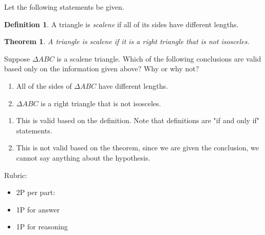 \documentclass{article}
\newtheorem*{theorem}{Theorem}
\theoremstyle{definition}
\newtheorem*{definition}{Definition}
\begin{document}
\begin{question}{4}
    Let the following statements be given. 
       \begin{definition}
          A triangle is \emph{scalene} if all of its sides have different lengths.
       \end{definition}
       \begin{theorem}
          A triangle is scalene if it is a right triangle that is not isosceles.
       \end{theorem}
    Suppose $\Delta ABC$ is a scalene triangle. 
    Which of the following conclusions are valid based only on the information given above? 
    Why or why not?
    \begin{enumerate}
        \item All of the sides of $\Delta ABC$ have different lengths.
        \item $\Delta ABC$ is a right triangle that is not isosceles.
    \end{enumerate}
\end{question}
\begin{solution}
    \begin{enumerate}
        \item This is valid based on the definition. Note that definitions are "if and only if" statements.
        \item This is not valid based on the theorem, since we are given the conclusion, 
            we cannot say anything about the hypothesis.
    \end{enumerate}
    
{\color{red} Rubric:
\begin{itemize}
\item 2P per part:
\item 1P for answer
\item 1P for reasoning
\end{itemize}}
\end{solution}
\end{document}
